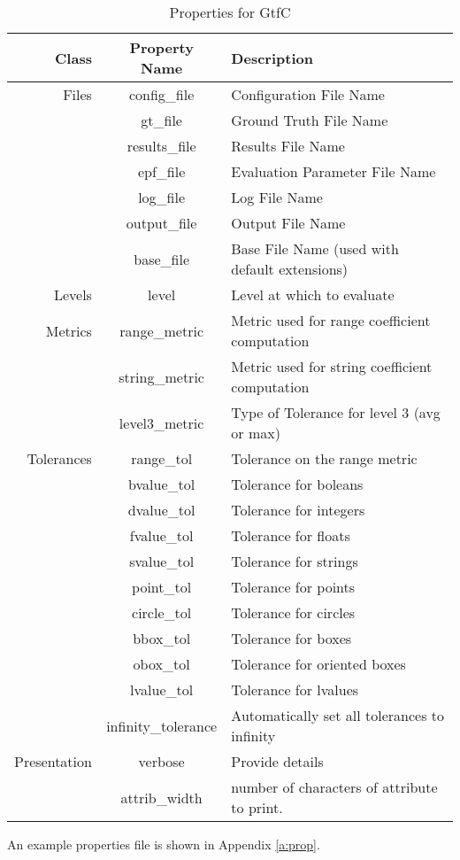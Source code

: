 \begin{table}
\caption{Properties for GtfC}

\begin{center}
\begin{tabular}{|r|c|l|} \hline
Class & Property Name& Description\\ \hline
Files &config\_file & Configuration File Name \\ 
&gt\_file & Ground Truth File Name\\ 
&results\_file & Results File Name\\
&epf\_file & Evaluation Parameter File Name\\  
&log\_file & Log File Name\\ 
&output\_file & Output File Name\\ 
&base\_file & Base File Name (used with default extensions)\\ \hline
Levels &level & Level at which to evaluate\\ \hline
Metrics & range\_metric & Metric used for range coefficient computation\\ 
&string\_metric & Metric used for string coefficient computation\\ 
&level3\_metric & Type of Tolerance for level 3 (avg or max)\\ \hline
Tolerances &range\_tol & Tolerance on the range metric\\ 
&bvalue\_tol & Tolerance for boleans\\ 
&dvalue\_tol & Tolerance for integers\\ 
&fvalue\_tol & Tolerance for floats\\ 
&svalue\_tol & Tolerance for strings\\ 
&point\_tol & Tolerance for points\\ 
&circle\_tol & Tolerance for circles\\
&bbox\_tol & Tolerance for boxes\\ 
&obox\_tol & Tolerance for oriented boxes\\ 
&lvalue\_tol &  Tolerance for lvalues \\ 
&infinity\_tolerance & Automatically set all tolerances to infinity\\ \hline
Presentation & verbose & Provide details\\ 
&attrib\_width & number of characters of attribute to print.\\ 
\hline
\end{tabular}
\end{center}
\end{table}
An example properties file is shown in Appendix \ref{a:prop}.

